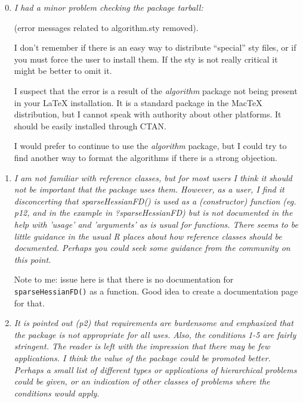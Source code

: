 \documentclass{article}
\newcommand{\pkg}[1]{\emph{#1}}
\newcommand{\code}[1]{\texttt{#1}}
\newcommand{\func}[1]{\code{#1}}
\newenvironment{revQuote}{\itshape}{\vspace{\baselineskip}}
\newenvironment{response}{\normalfont}{\vspace{\baselineskip}}
\begin{document}
\begin{enumerate}[align=left]
 \setcounter{enumi}{-1}

\item \begin{revQuote}
I had a minor problem checking the package tarball:

{\normalfont (error messages related to algorithm.sty removed).}

I don't remember if there is an easy way to distribute ``special'' sty files,
or if you must force the user to install them. If the sty is not really
critical it might be better to omit it.  
  
\end{revQuote}

\begin{response}
I suspect that the error is a result of the \pkg{algorithm} package
not being present in your LaTeX installation.  It is a standard
package in the MacTeX distribution, but I cannot speak with authority about other
platforms. It should be easily installed through CTAN.

I would prefer to continue to use the \pkg{algorithm} package, but I
could try to find another way to format the algorithms if there is a
strong objection.
\end{response}

\item \begin{revQuote}
I am not familiar with reference classes, but for most users I think it
should not be important that the package uses them. However, as a user, I
find it disconcerting that sparseHessianFD() is used as a (constructor)
function (eg. p12, and in the example in ?sparseHessianFD) but is not
documented in the help with 'usage' and 'arguments' as is usual for
functions. There seems to be little guidance in the usual R places about how
reference classes should be documented. Perhaps you could seek some guidance
from the community on this point.
\end{revQuote}


\begin{response}

  Note to me:  issue here is that there is no documentation for
  \func{sparseHessianFD()} as a function.  Good idea to create a
  documentation page for that.

  
\end{response}



\item \begin{revQuote}
It is pointed out (p2) that requirements are burdensome and emphasized
that the package is not appropriate for all uses. Also, the conditions 1-5
are fairly stringent. The reader is left with the impression that there may
be few applications. I think the value of the package could be promoted
better. Perhaps a small list of different types or applications of
hierarchical problems could be given, or an indication of other classes of
problems where the conditions would apply.
    

\end{revQuote}
\end{enumerate}
\end{document}
